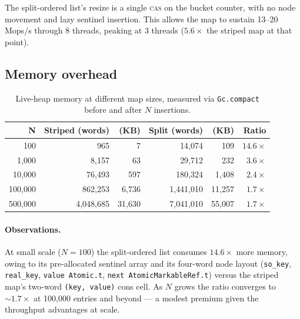 \documentclass[11pt,a4paper]{article}
\begin{document}
The split-ordered list's resize is a single \textsc{cas} on the bucket counter,
with no node movement and lazy sentinel insertion. This allows the map to
sustain 13--20\,Mops/s through 8 threads, peaking at 3 threads
($5.6\times$ the striped map at that point).

\FloatBarrier
\subsection{Memory overhead}

\begin{table}[h!]
\centering
\small
\begin{tabular}{@{}r rr rr r@{}}
\toprule
\textbf{N} & \textbf{Striped (words)} & \textbf{(KB)} &
            \textbf{Split (words)}   & \textbf{(KB)} & \textbf{Ratio} \\
\midrule
100        & 965           & 7        & 14{,}074      & 109      & $14.6\times$ \\
1{,}000    & 8{,}157       & 63       & 29{,}712      & 232      & $3.6\times$  \\
10{,}000   & 76{,}493      & 597      & 180{,}324     & 1{,}408  & $2.4\times$  \\
100{,}000  & 862{,}253     & 6{,}736  & 1{,}441{,}010 & 11{,}257 & $1.7\times$  \\
500{,}000  & 4{,}048{,}685 & 31{,}630 & 7{,}041{,}010 & 55{,}007 & $1.7\times$  \\
\bottomrule
\end{tabular}
\caption{Live-heap memory at different map sizes, measured via
\texttt{Gc.compact} before and after $N$ insertions.}
\label{tab:memory}
\end{table}
\paragraph{Observations.}
At small scale ($N = 100$) the split-ordered list consumes $14.6\times$ more
memory, owing to its pre-allocated sentinel array and its four-word node layout
(\texttt{so\_key}, \texttt{real\_key}, \texttt{value~Atomic.t},
\texttt{next~AtomicMarkableRef.t}) versus the striped map's two-word
\texttt{(key,~value)} cons cell. As $N$ grows the ratio converges to
${\sim}1.7\times$ at 100{,}000 entries and beyond --- a modest premium given
the throughput advantages at scale.
\end{document}
